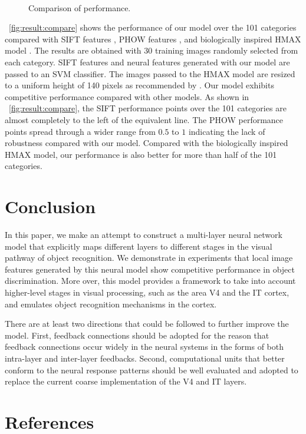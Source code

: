 \documentclass[5p]{elsarticle}
\begin{document}
\begin{figure}[h]
\centering
  \\
\caption{Comparison of performance.}
\label{fig:result2}
\end{figure}

\figurename~\ref{fig:result:compare} shows
the performance of our model over the 101 categories
compared with SIFT features \cite{Lowe1999},
PHOW features \cite{Lazebnik2006},
and biologically inspired HMAX model \cite{Serre2007}.
The results are obtained with 30 training images randomly selected 
from each category.
SIFT features and neural features generated with our model
are passed to an SVM classifier.
The images passed to the HMAX model are resized 
to a uniform height of 140 pixels as recommended by \cite{Serre2007}.
Our model exhibits competitive performance 
compared with other models.
As shown in \figurename~\ref{fig:result:compare},
the SIFT performance points over the 101 categories
are almost completely to the left of the equivalent line.
The PHOW performance points spread through 
a wider range from $0.5$ to $1$ indicating 
the lack of robustness compared with our model.
Compared with the biologically inspired HMAX model,
our performance is also better for more than half
of the 101 categories.

\section{Conclusion}\label{sec:conclusion}

In this paper, we make an attempt 
to construct a multi-layer neural network model 
that explicitly maps different layers 
to different stages in the visual pathway of object recognition. 
We demonstrate in experiments that local image features 
generated by this neural model show competitive performance 
in object discrimination. 
More over, this model provides a framework 
to take into account higher-level stages in visual processing, 
such as the area V4 and the IT cortex, 
and emulates object recognition mechanisms in the cortex.

There are at least two directions that could be
followed to further improve the model.
First, feedback connections should be
adopted for the reason that feedback connections
occur widely in the neural systems in the forms 
of both intra-layer and inter-layer feedbacks.
Second, computational units that better 
conform to the neural response patterns should
be well evaluated and adopted 
to replace the current coarse implementation 
of the V4 and IT layers.

\section*{References}


\end{document}
